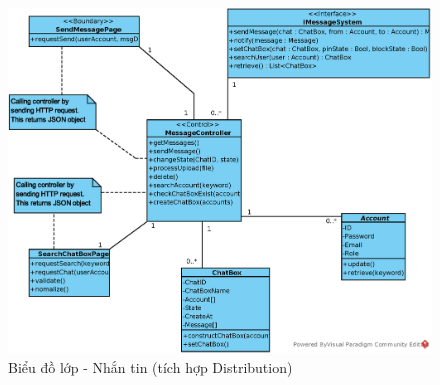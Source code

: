 \documentclass[./../main.tex]{subfiles}
\begin{document}
\begin{figure}[H]
    \centering
    \includegraphics[width=\linewidth]{./images/UseCaseDesignDiagram/ucd_dis_message.eps}
    \caption{Biểu đồ lớp - Nhắn tin (tích hợp Distribution)}
\end{figure}
\end{document}
